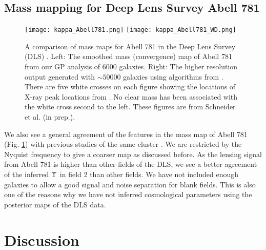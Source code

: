 \subsection{Mass mapping for Deep Lens Survey Abell 781}
\begin{figure}[h!]
	\centering
	\texttt{[image: kappa\_Abell781.png]}
	\texttt{[image: kappa\_Abell781\_WD.png]}
	\caption{A comparison of mass maps for Abell 781 in the Deep Lens Survey (DLS) 
		\label{fig:Abell781_massmap}.  Left: The smoothed mass (convergence) map of Abell 781 from 
		our GP analysis of 6000 galaxies.
		Right: The higher resolution output generated with $\sim 50000$ galaxies using 
		algorithms from \cite{Wittman2014}. 
		There are five white crosses on each figure showing the locations of X-ray
		peak locations from \cite{Sehgal2008}. No clear mass has been associated
		with the white cross second to the left. 
	These figures are from Schneider et al. (in prep.).
}
\end{figure}
We also see a general agreement of the features in the mass map of Abell 781
(Fig. \ref{fig:Abell781_massmap}) with previous studies of the same cluster 
\cite{Wittman2014}.  
We are restricted by the Nyquist frequency to give a coarser map as discussed
before.   
As the lensing signal from Abell 781 is higher than other fields of the
DLS, we see a better agreement of the inferred $\Upsilon$ in field 2 than
other fields. We have not included enough galaxies to allow a good signal and
noise separation for blank fields. 
This is also one of the reasons why  we
 have not inferred cosmological parameters using the
posterior maps of the DLS data.



\section{Discussion}

